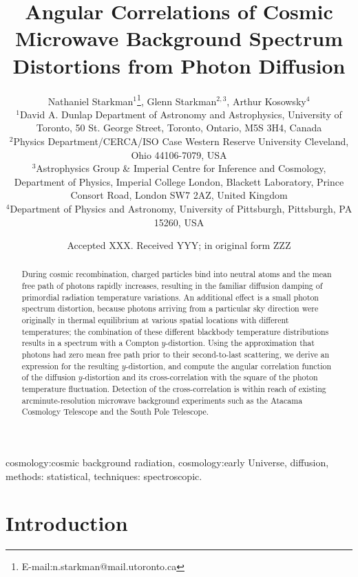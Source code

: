 \documentclass[fleqn,usenatbib]{mnras}
\title[Angular Correlations of CMB Spectrum Distortions from Photon Diffusion]{
Angular Correlations of Cosmic Microwave Background Spectrum Distortions from
Photon Diffusion}
\author[N. Starkman et al.]{ Nathaniel Starkman$^{1}$\thanks{E-mail:n.starkman@mail.utoronto.ca}, Glenn Starkman$^{2,3}$, Arthur Kosowsky$^{4}$ \\
$^{1}$David A. Dunlap Department of Astronomy and Astrophysics, University of Toronto, 50 St. George Street, Toronto, Ontario, M5S 3H4, Canada\\
$^{2}$Physics Department/CERCA/ISO Case Western Reserve University Cleveland, Ohio 44106-7079, USA\\
$^{3}$Astrophysics Group \& Imperial Centre for Inference and Cosmology, Department of Physics, Imperial College London, Blackett Laboratory, Prince Consort Road, London SW7 2AZ, United Kingdom\\
$^{4}$Department of Physics and Astronomy, University of Pittsburgh, Pittsburgh, PA 15260, USA\\
}
\date{Accepted XXX.  Received YYY; in original form ZZZ}
\begin{document}
\pagerange{\pageref{firstpage}--\pageref{lastpage}}
\maketitle

\begin{abstract}

    During cosmic recombination, charged particles bind into neutral atoms and
    the mean free path of photons rapidly increases, resulting in the familiar
    diffusion damping of primordial radiation temperature variations.  An
    additional effect is a small photon spectrum distortion, because photons
    arriving from a particular sky direction were originally in thermal
    equilibrium at various spatial locations with different temperatures; the
    combination of these different blackbody temperature distributions results
    in a spectrum with a Compton $y$-distortion.  Using the approximation that
    photons had zero mean free path prior to their second-to-last scattering, we
    derive an expression for the resulting $y$-distortion, and compute the
    angular correlation function of the diffusion $y$-distortion and its
    cross-correlation with the square of the photon temperature fluctuation.
    Detection of the cross-correlation is within reach of existing
    arcminute-resolution microwave background experiments such as the Atacama
    Cosmology Telescope and the South Pole Telescope.

\end{abstract}

\begin{keywords}
    cosmology:cosmic background radiation, cosmology:early Universe, diffusion,
    methods: statistical, techniques: spectroscopic.
\end{keywords}




\label{firstpage}

\section{Introduction} \label{sec:intro}
\end{document}
